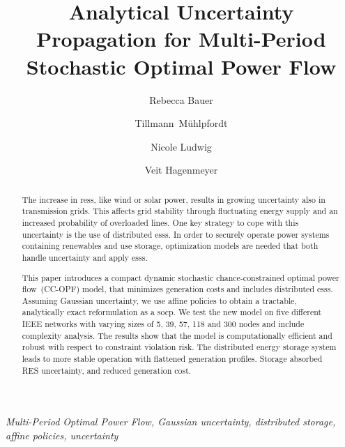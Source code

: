 \documentclass[final,3p,times,twocolumn]{elsarticle}  %
\newcommand{\PaperTitle}{Analytical Uncertainty Propagation for Multi-Period Stochastic Optimal Power Flow}
\begin{document}
\begin{frontmatter}

\title{\PaperTitle}

\author[add1]{Rebecca Bauer}
\author[add1]{Tillmann~M\"uhlpfordt}
\author[add2]{Nicole Ludwig}
\author[add1]{Veit Hagenmeyer}
\address[add1]{Institute for Automation und applied Informatics, Karlsruhe Institute of Technology}
\address[add2]{Cluster of Excellence “Machine Learning: New Perspectives for Science”, University of T\"ubingen, Germany}

\begin{abstract}

The increase in \glspl{res}, like wind or solar power, results in growing uncertainty also in transmission grids. 
This affects grid stability through fluctuating energy supply and an increased probability of overloaded lines. 
One key strategy to cope with this uncertainty is the use of distributed \glspl{ess}. 
In order to securely operate power systems containing renewables and use storage, optimization models are needed that both handle uncertainty and apply \glspl{ess}.

This paper introduces a compact dynamic stochastic chance-constrained optimal power flow~(CC-OPF) model, that minimizes generation costs and includes distributed \glspl{ess}. Assuming Gaussian uncertainty, we use affine policies to obtain a tractable, analytically exact reformulation as a \gls{socp}.
We test the new model on five different IEEE networks with varying sizes of 5, 39, 57, 118 and 300 nodes and include complexity analysis. 
The results show that the model is computationally efficient and robust with respect to constraint violation risk. The distributed energy storage system leads to more stable operation with flattened generation profiles. Storage absorbed RES uncertainty, and reduced generation cost. 

\end{abstract}

\begin{keyword}
\textit{Multi-Period Optimal Power Flow, Gaussian uncertainty, distributed storage, affine policies, uncertainty}
\end{keyword}

\end{frontmatter}
\end{document}
